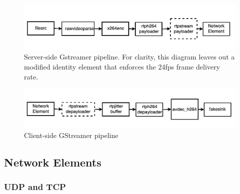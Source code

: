 \documentclass{mpaper}
\begin{document}
\begin{figure}
  \begin{center}
  \includegraphics[scale=0.25]{Server-side_pipeline.png}
  \end{center}
  
  \caption{\label{fig:GST_Server}Server-side Gstreamer pipeline. For clarity, this diagram leaves out a modified identity element that enforces the 24fps frame delivery rate.}
\end{figure}

\begin{figure}
  \begin{center}
  \includegraphics[scale=0.25]{Client-side_pipeline.png}
  \end{center}
  
  \caption{\label{fig:GST_Client}Client-side GStreamer pipeline}
\end{figure}

\subsection{Network Elements} \label{Network Elements}

\subsubsection{UDP and TCP} \label{UDP and TCP}
\end{document}
